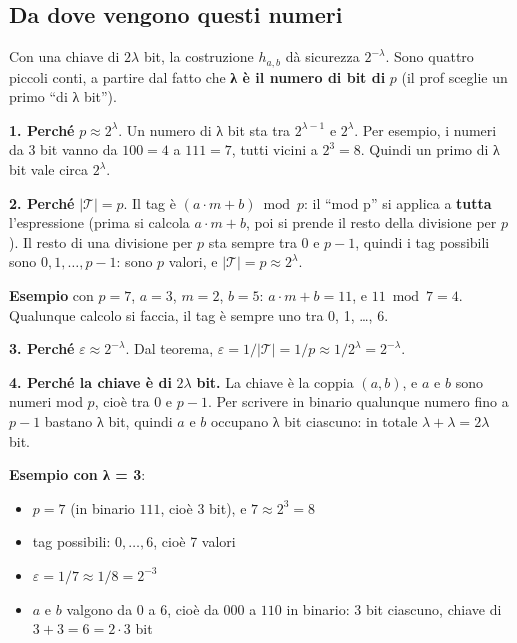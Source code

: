 \subsection{Da dove vengono questi numeri}

\begin{inbreve}

Con una chiave di \(2\lambda\) bit, la costruzione \(h_{a,b}\) dà sicurezza \(2^{-\lambda}\). Sono quattro piccoli conti, a partire dal fatto che \textbf{λ è il numero di bit di} \(p\) (il prof sceglie un primo ``di λ bit'').

\end{inbreve}

\textbf{1. Perché} \(p \approx 2^\lambda\). Un numero di λ bit sta tra \(2^{\lambda-1}\) e \(2^\lambda\). Per esempio, i numeri da 3 bit vanno da \(100 = 4\) a \(111 = 7\), tutti vicini a \(2^3 = 8\). Quindi un primo di λ bit vale circa \(2^\lambda\).

\textbf{2. Perché} \(|\mathcal{T}| = p\). Il tag è \((a \cdot m + b) \bmod p\): il ``mod p'' si applica a \textbf{tutta} l'espressione (prima si calcola \(a \cdot m + b\), poi si prende il resto della divisione per \(p\)). Il resto di una divisione per \(p\) sta sempre tra \(0\) e \(p-1\), quindi i tag possibili sono \(0, 1, \dots, p-1\): sono \(p\) valori, e \(|\mathcal{T}| = p \approx 2^\lambda\).

\begin{esempio}

\textbf{Esempio} con \(p = 7\), \(a = 3\), \(m = 2\), \(b = 5\): \(a \cdot m + b = 11\), e \(11 \bmod 7 = 4\). Qualunque calcolo si faccia, il tag è sempre uno tra 0, 1, \ldots, 6.

\end{esempio}

\textbf{3. Perché} \(\varepsilon \approx 2^{-\lambda}\). Dal teorema, \(\varepsilon = 1/|\mathcal{T}| = 1/p \approx 1/2^\lambda = 2^{-\lambda}\).

\textbf{4. Perché la chiave è di} \(2\lambda\) \textbf{bit.} La chiave è la coppia \((a, b)\), e \(a\) e \(b\) sono numeri mod \(p\), cioè tra \(0\) e \(p-1\). Per scrivere in binario qualunque numero fino a \(p-1\) bastano λ bit, quindi \(a\) e \(b\) occupano λ bit ciascuno: in totale \(\lambda + \lambda = 2\lambda\) bit.

\begin{esempio}

\textbf{Esempio con λ = 3}:

\begin{itemize}
\tightlist
\item
  \(p = 7\) (in binario \(111\), cioè 3 bit), e \(7 \approx 2^3 = 8\)
\item
  tag possibili: \(0, \dots, 6\), cioè 7 valori
\item
  \(\varepsilon = 1/7 \approx 1/8 = 2^{-3}\)
\item
  \(a\) e \(b\) valgono da 0 a 6, cioè da \(000\) a \(110\) in binario: 3 bit ciascuno, chiave di \(3 + 3 = 6 = 2 \cdot 3\) bit
\end{itemize}

\end{esempio}

